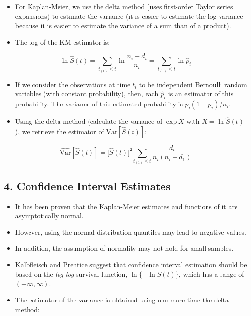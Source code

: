\documentclass[]{article}
\providecommand{\tightlist}{%
  \setlength{\itemsep}{0pt}\setlength{\parskip}{0pt}}
\begin{document}
\begin{itemize}
\tightlist
\item
  For Kaplan-Meier, we use the delta method (uses first-order Taylor
  series expansions) to estimate the variance (it is easier to estimate
  the log-variance because it is easier to estimate the variance of a
  sum than of a product).
\item
  The log of the KM estimator is:
\end{itemize}

\[\ln{\hat{S}(t)} = \sum\limits_{t_{(1)} \leq t}\ln \frac{n_i - d_i}{n_i} = \sum\limits_{t_{(1)} \leq t}\ln \hat{p}_i\]

\begin{itemize}
\tightlist
\item
  If we consider the observations at time \(t_i\) to be independent
  Bernoulli random variables (with constant probability), then, each
  \(\hat{p}_i\) is an estimator of this probability. The variance of
  this estimated probability is \(p_i(1-p_i) / n_i\).
\item
  Using the delta method (calculate the variance of \(\exp{X}\) with
  \(X=\ln{\hat{S}(t)}\)), we retrieve the estimator of
  \(\text{Var}[\hat{S}(t)]\):
\end{itemize}

\[\hat{\text{Var}}[\hat{S}(t)] = \big[\hat{S}(t)\big]^2 \sum\limits_{t_{(1)}\leq t} \frac{d_i}{n_i(n_i-d_1)}\]

\hypertarget{confidence-interval-estimates}{%
\subsection{4. Confidence Interval
Estimates}\label{confidence-interval-estimates}}

\begin{itemize}
\tightlist
\item
  It has been proven that the Kaplan-Meier estimates and functions of it
  are asymptotically normal.
\item
  However, using the normal distribution quantiles may lead to negative
  values.
\item
  In addition, the assumption of normality may not hold for small
  samples.
\item
  Kalbfleisch and Prentice suggest that confidence interval estimation
  should be based on the \emph{log-log} survival function,
  \(\ln\{-\ln \hat{S}(t)\}\), which has a range of
  \((-\infty, \infty)\).
\item
  The estimator of the variance is obtained using one more time the
  delta method:
\end{itemize}
\end{document}
